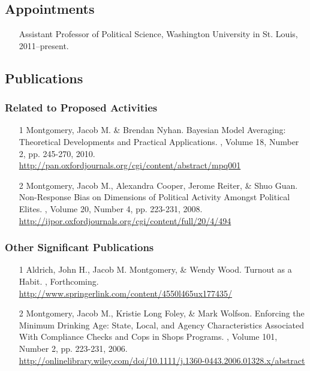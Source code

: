 \documentclass[pdftex,12pt,fullpage,oneside]{amsart}
\begin{document}
\subsection*{Appointments}
\begin{itemize}
\item[] Assistant Professor of Political Science, Washington
  University in St. Louis, 2011--present.
\end{itemize}

\subsection*{Publications}
\subsubsection*{Related to Proposed Activities}
\begin{itemize}
\item[1] Montgomery, Jacob M. \& Brendan Nyhan.  
\newblock  Bayesian Model Averaging: Theoretical Developments and
Practical Applications. 
, Volume  18, Number 2, pp. 245-270,
2010.
\newblock \url{http://pan.oxfordjournals.org/cgi/content/abstract/mpq001}
\item[2] Montgomery, Jacob M., Alexandra Cooper, Jerome Reiter, \&
  Shuo Guan.
\newblock  Non-Response Bias on Dimensions of Political Activity
Amongst Political Elites.
,
Volume 20, Number 4, pp.  223-231,  2008.
\newblock \url{http://ijpor.oxfordjournals.org/cgi/content/full/20/4/494}
\end{itemize}

\subsubsection*{Other Significant Publications}
\begin{itemize}
\item[1] Aldrich, John H., Jacob M. Montgomery, \& Wendy Wood.
\newblock Turnout as a Habit.
, Forthcoming.
\newblock \url{http://www.springerlink.com/content/4550l465ux177435/}

\item[2] Montgomery, Jacob M., Kristie Long Foley, \& Mark Wolfson.
  \newblock Enforcing the Minimum Drinking Age: State, Local, and
  Agency Characteristics Associated With Compliance Checks and Cops in
  Shops Programs.
, Volume 101, Number 2, pp. 223-231, 2006.
\newblock \url{http://onlinelibrary.wiley.com/doi/10.1111/j.1360-0443.2006.01328.x/abstract}
\end{itemize}
\end{document}
